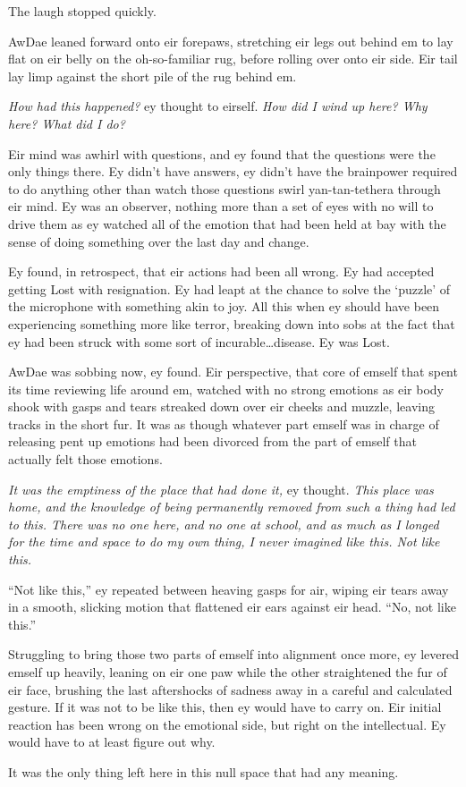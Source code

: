 The laugh stopped quickly.

AwDae leaned forward onto eir forepaws, stretching eir legs out behind em to lay flat on eir belly on the oh-so-familiar rug, before rolling over onto eir side.  Eir tail lay limp against the short pile of the rug behind em.

\textit{How had this happened?} ey thought to eirself.  \textit{How did I wind up here?  Why here?  What did I do?}

Eir mind was awhirl with questions, and ey found that the questions were the only things there.  Ey didn't have answers, ey didn't have the brainpower required to do anything other than watch those questions swirl yan-tan-tethera through eir mind.  Ey was an observer, nothing more than a set of eyes with no will to drive them as ey watched all of the emotion that had been held at bay with the sense of doing something over the last day and change.

Ey found, in retrospect, that eir actions had been all wrong.  Ey had accepted getting Lost with resignation.  Ey had leapt at the chance to solve the `puzzle' of the microphone with something akin to joy.  All this when ey should have been experiencing something more like terror, breaking down into sobs at the fact that ey had been struck with some sort of incurable\ldots{}disease.  Ey was Lost.

AwDae was sobbing now, ey found.  Eir perspective, that core of emself that spent its time reviewing life around em, watched with no strong emotions as eir body shook with gasps and tears streaked down over eir cheeks and muzzle, leaving tracks in the short fur.  It was as though whatever part emself was in charge of releasing pent up emotions had been divorced from the part of emself that actually felt those emotions.

\textit{It was the emptiness of the place that had done it,} ey thought.  \textit{This place was home, and the knowledge of being permanently removed from such a thing had led to this.  There was no one here, and no one at school, and as much as I longed for the time and space to do my own thing, I never imagined like this.  Not like this.}

``Not like this,'' ey repeated between heaving gasps for air, wiping eir tears away in a smooth, slicking motion that flattened eir ears against eir head.  ``No, not like this.''

Struggling to bring those two parts of emself into alignment once more, ey levered emself up heavily, leaning on eir one paw while the other straightened the fur of eir face, brushing the last aftershocks of sadness away in a careful and calculated gesture.  If it was not to be like this, then ey would have to carry on.  Eir initial reaction has been wrong on the emotional side, but right on the intellectual.  Ey would have to at least figure out why.

It was the only thing left here in this null space that had any meaning.
